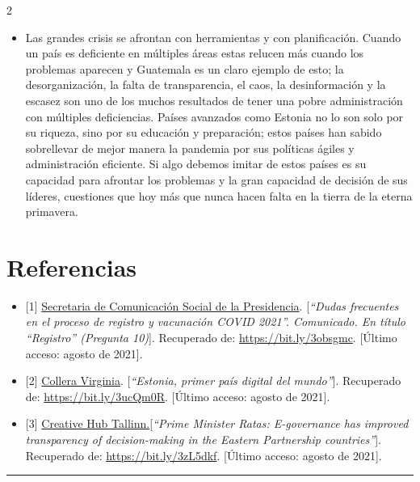 \documentclass[12pt,spanish,Letterpaper,openany]{book}
\providecommand{\tightlist}{%
  \setlength{\itemsep}{0pt}\setlength{\parskip}{0pt}}
\newcommand{\HRule}{\begin{center}\rule{0.5\linewidth}{0.2mm}\end{center}}
\begin{document}
\begin {multicols}{2}
\begin{itemize}
\tightlist
\item
  Las grandes crisis se afrontan con herramientas y con planificación. Cuando un país es deficiente
  en múltiples áreas estas relucen más cuando los problemas aparecen y Guatemala es un claro
  ejemplo de esto; la desorganización, la falta de transparencia, el caos, la desinformación y la
  escasez son uno de los muchos resultados de tener una pobre administración con múltiples
  deficiencias. Países avanzados como Estonia no lo son solo por su riqueza, sino por su educación
  y preparación; estos países han sabido sobrellevar de mejor manera la pandemia por sus políticas
  ágiles y administración eficiente. Si algo debemos imitar de estos países es su capacidad para
  afrontar los problemas y la gran capacidad de decisión de sus líderes, cuestiones que hoy más
  que nunca hacen falta en la tierra de la eterna primavera.
\end{itemize}

\hypertarget{referencias-10}{%
\section{Referencias}\label{referencias-10}}

\begin{itemize}
\item
  {[}1{]} \href{https://prensa.gob.gt/}{Secretaria de Comunicación Social de la Presidencia}. {[}\emph{``Dudas frecuentes en el proceso de registro y vacunación COVID 2021''. Comunicado. En título ``Registro'' (Pregunta 10)}{]}. Recuperado de: \url{https://bit.ly/3obsgmc}. {[}Último acceso: agosto de 2021{]}.
\item
  {[}2{]} \href{https://elpais.com/}{Collera Virginia}. {[}\emph{``Estonia, primer país digital del mundo''}{]}. Recuperado de: \url{https://bit.ly/3ucQm0R}. {[}Último acceso: agosto de 2021{]}.
\item
  {[}3{]} \href{https://www.valitsus.ee/}{Creative Hub Tallinn.}{[}\emph{``Prime Minister Ratas: E-governance has improved transparency of decision-making in the Eastern Partnership countries''}{]}. Recuperado de: \url{https://bit.ly/3zL5dkf}. {[}Último acceso: agosto de 2021{]}.
\end{itemize}

\end {multicols}

\medskip

\HRule

\medskip
\end{document}
